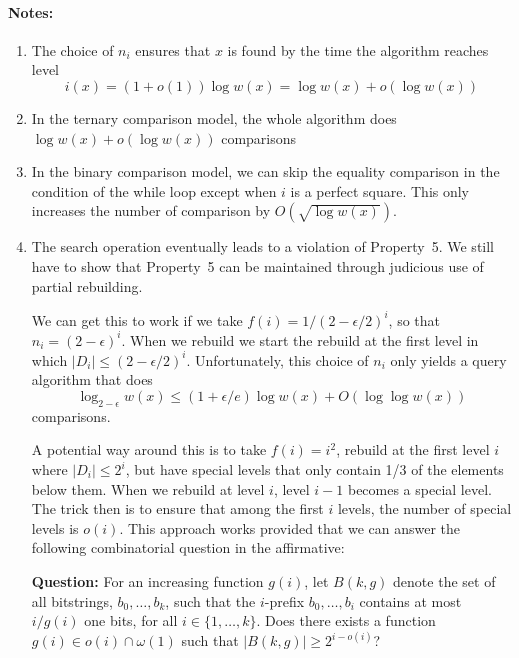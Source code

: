 \documentclass{patmorin}
\begin{document}
\paragraph{Notes:}
\begin{enumerate}
  \item The choice of $n_i$ ensures that $x$ is found by the time the
  algorithm reaches level
  \[
     i(x) = (1+o(1))\log w(x) = \log w(x) + o(\log w(x))
  \]
  \item In the ternary comparison model, the whole algorithm does $\log
     w(x)+o(\log w(x))$ comparisons
  \item In the binary comparison model, we can skip the equality
    comparison in the condition of the while loop except when $i$ is
    a perfect square.  This only increases the number of comparison by
    $O(\sqrt{\log w(x)})$.
  \item The search operation eventually leads to a violation of
    Property~5.  We still have to show that Property~5 can be maintained
    through judicious use of partial rebuilding.

   We can get this to work if we take $f(i)=1/(2-\epsilon/2)^i$, so that
   $n_i=(2-\epsilon)^i$.  When we rebuild we start the rebuild at the
   first level in which $|D_i|\le (2-\epsilon/2)^i$.  Unfortunately,
   this choice of $n_i$ only yields a query algorithm that does
   \[
     \log_{2-\epsilon} w(x) \le (1+\epsilon/e)\log w(x) + O(\log\log w(x))
   \]
   comparisons.

   A potential way around this is to take $f(i)=i^2$, rebuild at the
   first level $i$ where $|D_i|\le 2^{i}$, but have special levels
   that only contain 1/3 of the elements below them.  When we rebuild
   at level $i$, level $i-1$ becomes a special level.  The trick then
   is to ensure that among the first $i$ levels, the number of special
   levels is $o(i)$.  This approach works provided that we can answer
   the following combinatorial question in the affirmative:

   \noindent\textbf{Question:} For an increasing function $g(i)$,
   let $B(k,g)$ denote the set of all bitstrings, $b_0,\ldots,b_k$,
   such that the $i$-prefix $b_0,\ldots,b_i$ contains at most $i/g(i)$
   one bits, for all $i\in\{1,\ldots,k\}$.  Does there exists a function
   $g(i)\in o(i)\cap\omega(1)$ such that $|B(k,g)|\ge 2^{i-o(i)}$?


\end{enumerate}
\end{document}
